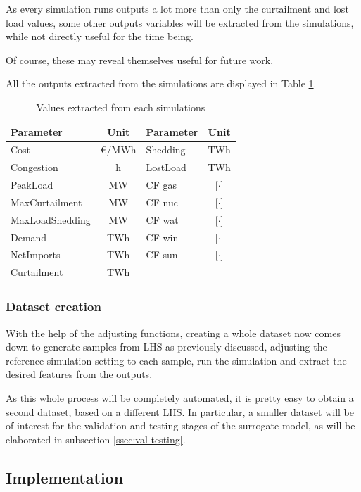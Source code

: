 As every simulation runs outputs a lot more than only the curtailment and lost load values, some other outputs variables will be extracted from the simulations, while not directly useful for the time being.

Of course, these may reveal themselves useful for future work.

All the outputs extracted from the simulations are displayed in Table \ref{table:values-extracted}.

\begin{table}[h]
    \centering
    \begin{tabular}{|l c|l c|}
		\hline
		Parameter & Unit & Parameter & Unit \\
		\hline
		Cost            & €/MWh & Shedding & TWh \\
		Congestion      & h     & LostLoad & TWh \\
		PeakLoad        & MW    & CF gas  & [$\cdot$] \\
		MaxCurtailment  & MW    & CF nuc  & [$\cdot$] \\
		MaxLoadShedding & MW    & CF wat   & [$\cdot$] \\
		Demand          & TWh   & CF win   & [$\cdot$] \\
		NetImports      & TWh   & CF sun   & [$\cdot$] \\
		Curtailment     & TWh   &  &  \\
		\hline
	\end{tabular}
	\caption{Values extracted from each simulations}
	\label{table:values-extracted}
\end{table}

\subsubsection{Dataset creation}

With the help of the adjusting functions, creating a whole dataset now comes down to generate samples from LHS as previously discussed, adjusting the reference simulation setting to each sample, run the simulation and extract the desired features from the outputs.

As this whole process will be completely automated, it is pretty easy to obtain a second dataset, based on a different LHS. In particular, a smaller dataset will be of interest for the validation and testing stages of the surrogate model, as will be elaborated in subsection \ref{ssec:val-testing}.

\subsection{Implementation}

